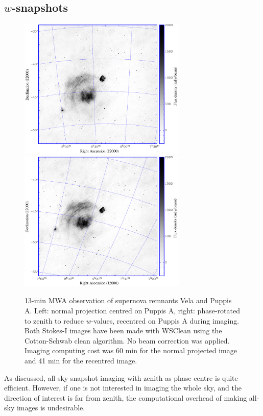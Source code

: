\documentclass[useAMS,usenatbib]{mn2e}
\begin{document}
\subsection{$w$-snapshots} \label{sec:snapshot-imaging}
\begin{figure}
\begin{center}
\includegraphics[width=8cm]{img/vela-normal-projection}
\includegraphics[width=8cm]{img/vela-zenith-projection}
\caption{13-min MWA observation of supernova remnants Vela and Puppis A. Left: normal projection centred on Puppis A, right: phase-rotated to zenith to reduce $w$-values, recentred on Puppis A during imaging. Both Stokes-I images have been made with WSClean using the Cotton-Schwab clean algorithm. No beam correction was applied. Imaging computing cost was 60 min for the normal projected image and 41 min for the recentred image.}
\label{fig:vela-projection-example}
\end{center}
\end{figure}
As discussed, all-sky snapshot imaging with zenith as phase centre is quite efficient. However, if one is not interested in imaging the whole sky, and the direction of interest is far from zenith, the computational overhead of making all-sky images is undesirable.
\end{document}
